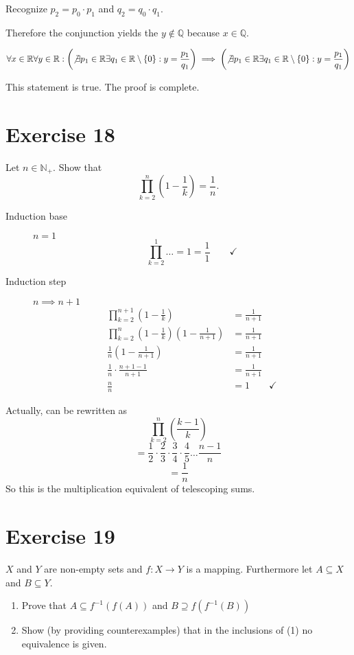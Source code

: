 \documentclass[a4paper]{article}
\theoremstyle{definition}
\newcommand\set[1]{\left\{#1\right\}}
\begin{document}
Recognize $p_2 = p_0 \cdot p_1$ and $q_2 = q_0 \cdot q_1$.

Therefore the conjunction yields the $y \not\in \mathbb Q$ because $x \in \mathbb Q$.

\[
    \forall x \in \mathbb R \forall y \in \mathbb R:
    \left(\not\exists p_1 \in \mathbb R \exists q_1 \in \mathbb R \setminus \set{0}: y = \frac{p_1}{q_1}\right) \implies
    \left(\not\exists p_1 \in \mathbb R \exists q_1 \in \mathbb R \setminus \set{0}: y = \frac{p_1}{q_1}\right)
\]

This statement is true. The proof is complete.

\section{Exercise 18}
\begin{ex}
  Let $n \in \mathbb{N}_+$. Show that
  \[ \prod_{k=2}^n \left(1 - \frac1k\right) = \frac1n . \]
\end{ex}

\begin{description}
  \item[Induction base] $n = 1$
    \[ \prod_{k=2}^1 \dots = 1 = \frac11 \qquad\checkmark \]
  \item[Induction step] $n \implies n + 1$
    \begin{align*}
      \prod_{k=2}^{n+1} \left(1 - \frac{1}{k}\right) &= \frac{1}{n+1} \\
      \prod_{k=2}^{n} \left(1 - \frac{1}{k}\right) \left(1 - \frac{1}{n+1}\right) &= \frac{1}{n+1} \\
      \frac 1n \left(1 - \frac{1}{n+1}\right) &= \frac{1}{n+1} \\
      \frac 1n \cdot \frac{n+1-1}{n+1} &= \frac{1}{n+1} \\
      \frac nn &= 1 \qquad\checkmark
    \end{align*}
\end{description}

Actually, can be rewritten as
\[ \prod_{k=2}^n \left(\frac{k-1}{k}\right) \]
\[ = \frac12 \cdot \frac23 \cdot \frac34 \cdot \frac45 \dots \frac{n-1}{n} \]
\[ = \frac1n \]
So this is the multiplication equivalent of telescoping sums.

\section{Exercise 19}

\begin{ex}
  $X$ and $Y$ are non-empty sets and $f: X \to Y$ is a mapping.
  Furthermore let $A \subseteq X$ and $B \subseteq Y$.
  \begin{enumerate}
    \item Prove that $A \subseteq f^{-1}(f(A))$ and $B \supseteq f(f^{-1}(B))$
    \item Show (by providing counterexamples) that in the inclusions of (1)
      no equivalence is given.
  \end{enumerate}
\end{ex}
\end{document}
